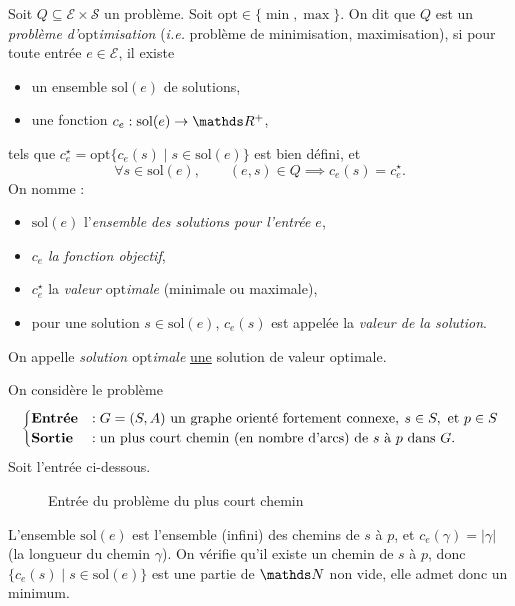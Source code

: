\begin{defn}
	Soit $Q \subseteq \mathcal{E} \times \mathcal{S}$\/ un problème.
	Soit $\mathrm{opt} \in \{\min, \max\}$. On dit que $Q$\/ est un \textit{problème d'$\mathrm{opt}$imisation} (\textit{i.e.} problème de minimisation, maximisation), si pour toute entrée $e \in \mathcal{E}$, il existe
	\begin{itemize}
		\item un ensemble $\mathrm{sol}(e)$\/ de solutions,
		\item une fonction $c_e : \mathrm{sol}(e) \to \R^+$,
	\end{itemize}
	tels que $c_e^\star = \mathrm{opt}\{c_e(s)  \mid s \in \mathrm{sol}(e)\}$\/ est bien défini, et \[
		\forall s \in \mathrm{sol}(e),\quad\quad (e, s) \in Q \implies c_e(s) = c_e^\star 
	.\]
	On nomme :
	\begin{itemize}
		\item $\mathrm{sol}(e)$\/ l'\textit{ensemble des solutions pour l'entrée $e$},
		\item $c_e$\/ \textit{la fonction objectif},
		\item $c_e^\star$\/ la \textit{valeur $\mathrm{opt}$imale} (minimale ou maximale),
		\item pour une solution $s \in \mathrm{sol}(e)$, $c_e(s)$\/ est appelée la \textit{valeur de la solution}.
	\end{itemize}
	On appelle \textit{solution $\mathrm{opt}$imale} \ul{une} solution de valeur $\mathrm{opt}$imale.
\end{defn}

\begin{exm}
	On considère le problème \[
		\begin{cases}
			\text{\textbf{Entrée}} &: G = (S, A) \text{ un graphe orienté fortement connexe},\: s \in S, \text{ et } p \in S\\
			\text{\textbf{Sortie}} &: \text{un plus court chemin (en nombre d'arcs) de $s$ à $p$ dans $G$.}
		\end{cases}
	\]
	Soit l'entrée ci-dessous.
	\begin{figure}[H]
		\centering
		\caption{Entrée du problème du plus court chemin}
	\end{figure}
	L'ensemble $\mathrm{sol}(e)$\/ est l'ensemble (infini) des chemins de $s$\/ à $p$, et $c_e(\gamma) = |\gamma|$\/ (la longueur du chemin $\gamma$).
	On vérifie qu'il existe un chemin de $s$\/ à $p$, donc $\{c_e(s)  \mid s \in \mathrm{sol}(e)\} $\/ est une partie de $\N$\/ non vide, elle admet donc un minimum.
\end{exm}

